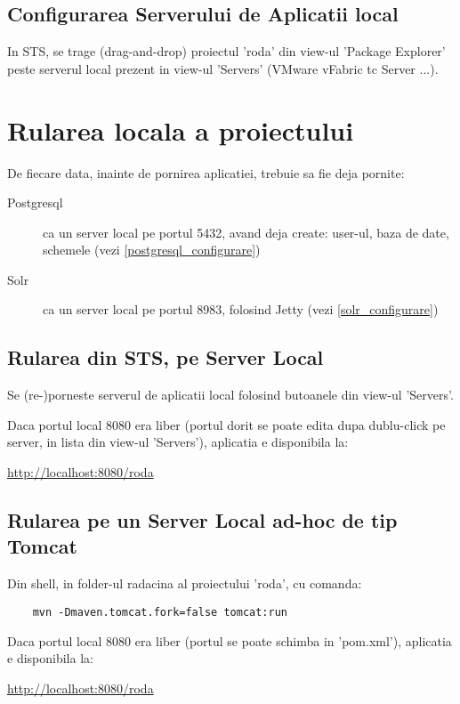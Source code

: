
\subsection{Configurarea Serverului de Aplicatii local}
In STS, se trage (drag-and-drop) proiectul 'roda' din view-ul 'Package Explorer' 
peste serverul local prezent in view-ul 'Servers' (VMware vFabric tc Server ...).

\section{Rularea locala a proiectului}

De fiecare data, inainte de pornirea aplicatiei, trebuie sa fie deja pornite:
\begin{description}
\item[Postgresql] 
ca un server local pe portul 5432, avand deja create: 
user-ul, baza de date, schemele (vezi \ref{postgresql_configurare})
\item[Solr] 
ca un server local pe portul 8983, folosind Jetty (vezi \ref{solr_configurare})
\end{description}

\subsection{Rularea din STS, pe Server Local}
Se (re-)porneste serverul de aplicatii local folosind butoanele din view-ul
'Servers'.

Daca portul local 8080 era liber (portul dorit se poate edita dupa dublu-click pe
server, in lista din view-ul 'Servers'), aplicatia e disponibila la:

\url{http://localhost:8080/roda}

\subsection{Rularea pe un Server Local ad-hoc de tip Tomcat}
Din shell, in folder-ul radacina al proiectului 'roda', cu comanda:
\begin{lstlisting}
	mvn -Dmaven.tomcat.fork=false tomcat:run
\end{lstlisting}
Daca portul local 8080 era liber (portul se poate schimba in 'pom.xml'),
aplicatia e disponibila la:

\url{http://localhost:8080/roda}

